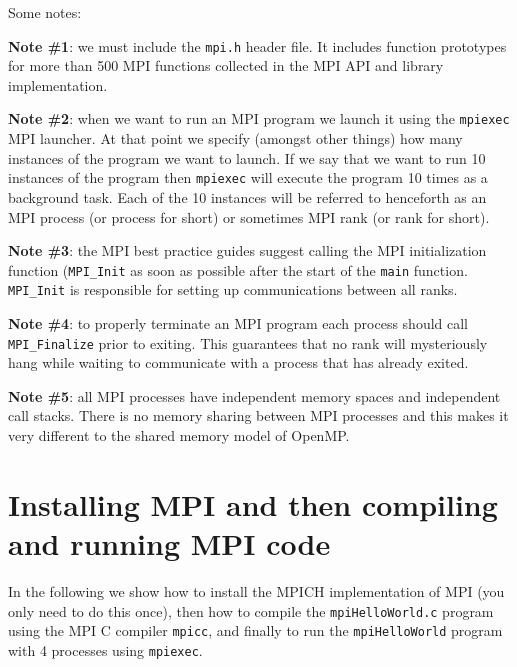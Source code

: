 Some notes:

{\bf Note \#1}: we must include the \texttt{mpi.h} header file. It includes function prototypes for more than 500 MPI functions collected in the MPI API and library implementation.

{\bf Note \#2}: when we want to run an MPI program we launch it using the \texttt{mpiexec} MPI launcher. At that point we specify (amongst other things) how many instances of the program we want to launch. If we say that we want to run 10 instances of the program then \texttt{mpiexec} will execute the program 10 times as a background task. Each of the 10 instances will be referred to henceforth as an MPI process (or process for short) or sometimes MPI rank (or rank for short).

{\bf Note \#3}: the MPI best practice guides suggest calling the MPI initialization function (\texttt{MPI\_Init} as soon as possible after the start of the \texttt{main} function. \texttt{MPI\_Init} is responsible for setting up communications between all ranks.

{\bf Note \#4}: to properly terminate an MPI program each process should call \texttt{MPI\_Finalize} prior to exiting. This guarantees that no rank will mysteriously hang while waiting to communicate with a process that has already exited.

{\bf Note \#5}: all MPI processes have independent memory spaces and independent call stacks. There is no memory sharing between MPI processes and this makes it very different to the shared memory model of OpenMP.

\section{Installing MPI and then compiling and running MPI code}

In the following we show how to install the MPICH implementation of MPI (you only need to do this once), then  how to compile the \texttt{mpiHelloWorld.c} program using the MPI C compiler \texttt{mpicc}, and finally to run the \texttt{mpiHelloWorld} program with 4 processes using \texttt{mpiexec}.


